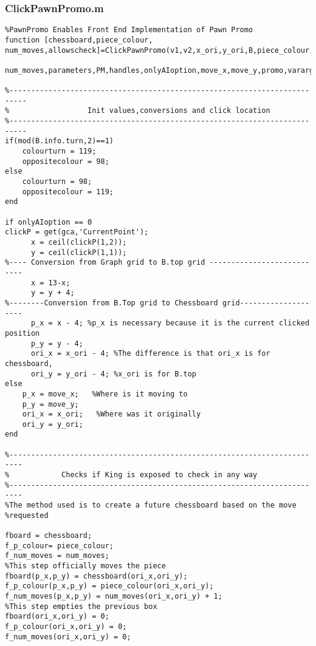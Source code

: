 \documentclass{article}
\begin{document}
\subsubsection{ClickPawnPromo.m}
\begin{lstlisting}
%PawnPromo Enables Front End Implementation of Pawn Promo
function [chessboard,piece_colour, num_moves,allowscheck]=ClickPawnPromo(v1,v2,x_ori,y_ori,B,piece_colour,chessboard,...
    num_moves,parameters,PM,handles,onlyAIoption,move_x,move_y,promo,varargin)

%--------------------------------------------------------------------------
%                  Init values,conversions and click location
%--------------------------------------------------------------------------
if(mod(B.info.turn,2)==1)
    colourturn = 119;
    oppositecolour = 98;
else
    colourturn = 98;
    oppositecolour = 119;
end

if onlyAIoption == 0
clickP = get(gca,'CurrentPoint');
      x = ceil(clickP(1,2));
      y = ceil(clickP(1,1));
%---- Conversion from Graph grid to B.top grid ---------------------------
      x = 13-x;      
      y = y + 4;
%--------Conversion from B.Top grid to Chessboard grid--------------------
      p_x = x - 4; %p_x is necessary because it is the current clicked position
      p_y = y - 4;
      ori_x = x_ori - 4; %The difference is that ori_x is for chessboard,
      ori_y = y_ori - 4; %x_ori is for B.top
else
    p_x = move_x;   %Where is it moving to
    p_y = move_y;
    ori_x = x_ori;   %Where was it originally
    ori_y = y_ori;
end

%-------------------------------------------------------------------------
%            Checks if King is exposed to check in any way
%-------------------------------------------------------------------------
%The method used is to create a future chessboard based on the move
%requested

fboard = chessboard;
f_p_colour= piece_colour;
f_num_moves = num_moves;
%This step officially moves the piece
fboard(p_x,p_y) = chessboard(ori_x,ori_y);
f_p_colour(p_x,p_y) = piece_colour(ori_x,ori_y);
f_num_moves(p_x,p_y) = num_moves(ori_x,ori_y) + 1;
%This step empties the previous box
fboard(ori_x,ori_y) = 0;
f_p_colour(ori_x,ori_y) = 0;
f_num_moves(ori_x,ori_y) = 0;


\end{lstlisting}
\end{document}
